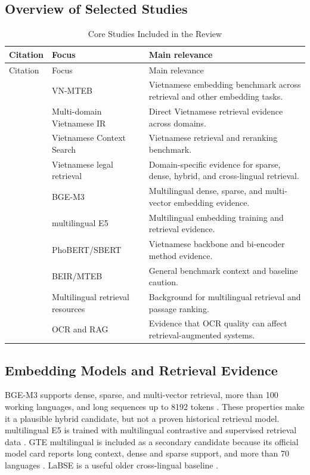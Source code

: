 \documentclass[11pt]{article}
\begin{document}
\subsection{Overview of Selected Studies}
\begin{longtable}{p{}p{}p{}}
\caption{Core Studies Included in the Review}
\label{tab:core-studies}\\
\toprule
Citation & Focus & Main relevance \\
\midrule
\endfirsthead
\toprule
Citation & Focus & Main relevance \\
\midrule
\endhead
\cite{pham-etal-2026-vn} & VN-MTEB & Vietnamese embedding benchmark across retrieval and other embedding tasks. \\
\cite{nguyen-quan-2026-works} & Multi-domain Vietnamese IR & Direct Vietnamese retrieval evidence across domains. \\
\cite{nguyen-etal-2024-advancing} & Vietnamese Context Search & Vietnamese retrieval and reranking benchmark. \\
\cite{khang-etal-2024-vietnamese-legal,nguyen-etal-2025-improving,ba-etal-2024-vietnamese-legal-ir} & Vietnamese legal retrieval & Domain-specific evidence for sparse, dense, hybrid, and cross-lingual retrieval. \\
\cite{chen-etal-2024-m3} & BGE-M3 & Multilingual dense, sparse, and multi-vector embedding evidence. \\
\cite{wang-etal-2024-me5} & multilingual E5 & Multilingual embedding training and retrieval evidence. \\
\cite{nguyen-tuan-nguyen-2020-phobert,reimers-gurevych-2019-sentence} & PhoBERT/SBERT & Vietnamese backbone and bi-encoder method evidence. \\
\cite{thakur-etal-2021-beir,muennighoff-etal-2023-mteb} & BEIR/MTEB & General benchmark context and baseline caution. \\
\cite{zhang-etal-2023-miracl,bonifacio-etal-2021-mmarco} & Multilingual retrieval resources & Background for multilingual retrieval and passage ranking. \\
\cite{zhang-etal-2024-ocr-hinders-rag} & OCR and RAG & Evidence that OCR quality can affect retrieval-augmented systems. \\
\bottomrule
\end{longtable}

\subsection{Embedding Models and Retrieval Evidence}
BGE-M3 supports dense, sparse, and multi-vector retrieval, more than 100 working languages, and long sequences up to 8192 tokens \cite{chen-etal-2024-m3}. These properties make it a plausible hybrid candidate, but not a proven historical retrieval model. multilingual E5 is trained with multilingual contrastive and supervised retrieval data \cite{wang-etal-2024-me5}. GTE multilingual is included as a secondary candidate because its official model card reports long context, dense and sparse support, and more than 70 languages \cite{alibaba-nlp-2026-gte-multilingual-base}. LaBSE is a useful older cross-lingual baseline \cite{feng-etal-2022-language}.
\end{document}
